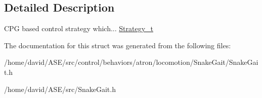 \subsection{Detailed Description}
CPG based control strategy which...  \hyperlink{structStrategy__t}{Strategy\_\-t} 

The documentation for this struct was generated from the following files:\begin{CompactItemize}
\item 
/home/david/ASE/src/control/behaviors/atron/locomotion/SnakeGait/SnakeGait.h\item 
/home/david/ASE/src/SnakeGait.h\end{CompactItemize}
